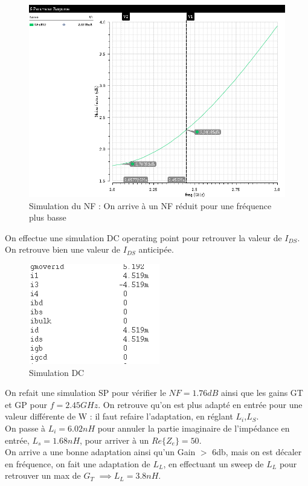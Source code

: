 \documentclass[a4paper]{article}
\begin{document}
\begin{figure}[!htb]
\begin{center}
  \includegraphics[scale=0.40]{Q6-NF-dB10-bigW.png}
  \caption{Simulation du NF : On arrive \`a un NF r\'eduit pour une fr\'equence plus basse}
  \label{facteur-bruit}
\end{center}
\end{figure}

On effectue une simulation DC operating point pour retrouver la valeur de $I_{DS}$.
On retrouve bien une valeur de $I_{DS}$ anticip\'ee.

\begin{figure}[!htb]
\begin{center}
  \includegraphics[scale=0.40]{Q6c-Ids0.png}
  \caption{Simulation DC}
  \label{facteur-bruit}
\end{center}
\end{figure}

On refait une simulation SP pour v\'erifier le $NF = 1.76dB$  ainsi que les gains GT et GP
pour $f=2.45 GHz$. On retrouve qu'on est plus adapt\'e en entr\'ee
pour une valeur diff\'erente de W : il faut refaire l'adaptation, en r\'eglant $L_i$,$L_S$.\\
On passe \`a $L_i = 6.02 nH$ pour annuler la partie imaginaire de l'imp\'edance en entr\'ee,
$L_s = 1.68 nH$, pour arriver \`a un $Re\{Z_e\}=50$. \\
On arrive a une bonne adaptation ainsi qu'un Gain $>$ 6db, mais on est d\'ecaler en fr\'equence,
on fait une adaptation de $L_L$, en effectuant un sweep de $L_L$ pour retrouver un max de $G_T$
$\implies L_L = 3.8 nH$.
\end{document}
